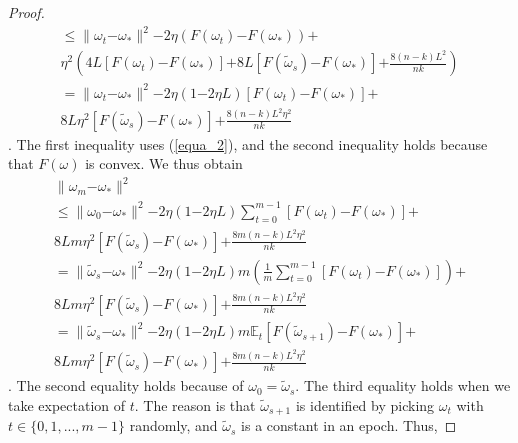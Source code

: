 \documentclass[letterpaper]{article}
\begin{document}
\begin{proof}
\begin{equation}
\begin{array}{ll}
\le \parallel  \omega_{t}\mathrm{-}\omega_\ast  \parallel^2  \mathrm{-}2\eta( F(\omega_t) \mathrm{-} F(\omega_\ast) ) \mathrm{+} \\
\eta^2 \left(  4L [F(\omega_t)\mathrm{-}F(\omega_\ast)] \mathrm{+} 8L [F(\tilde{\omega}_s)\mathrm{-}F(\omega_\ast)] \mathrm{+} \frac{8(n-k)L^2}{nk}\right)  \\ 
= \parallel  \omega_{t}\mathrm{-}\omega_\ast  \parallel^2  \mathrm{-}2\eta(1\mathrm{-}2\eta L) [F(\omega_t) \mathrm{-} F(\omega_\ast) ] \mathrm{+} \\
8L \eta^2 [F(\tilde{\omega}_s)\mathrm{-}F(\omega_\ast)] \mathrm{+} \frac{8(n-k)L^2\eta^2}{nk}
\end{array} 
\end{equation}. The first inequality uses (\ref{equa_2}), and the second inequality holds because that $F(\omega)$ is convex.  We thus obtain 
\begin{equation}
\begin{array}{ll}
\parallel  \omega_{m}\mathrm{-}\omega_\ast \parallel^2\\
\le \parallel  \omega_{0}\mathrm{-}\omega_\ast  \parallel^2  \mathrm{-}2\eta(1\mathrm{-}2\eta L)\sum\limits_{t=0}^{m-1} [F(\omega_t) \mathrm{-} F(\omega_\ast) ] \mathrm{+} \\
8Lm \eta^2 [F(\tilde{\omega}_s)\mathrm{-}F(\omega_\ast)] \mathrm{+} \frac{8m(n-k)L^2\eta^2}{nk} \\
=\parallel  \tilde{\omega}_{s}\mathrm{-}\omega_\ast  \parallel^2  \mathrm{-}2\eta(1\mathrm{-}2\eta L)m \left(\frac{1}{m}\sum\limits_{t=0}^{m-1} [F(\omega_t) \mathrm{-} F(\omega_\ast) ] \right)\mathrm{+} \\
8Lm \eta^2 [F(\tilde{\omega}_s)\mathrm{-}F(\omega_\ast)] \mathrm{+} \frac{8m(n-k)L^2\eta^2}{nk}\\
= \parallel  \tilde{\omega}_{s}\mathrm{-}\omega_\ast  \parallel^2  \mathrm{-}2\eta(1\mathrm{-}2\eta L)m \mathbb{E}_t[F(\tilde{\omega}_{s+1}) \mathrm{-} F(\omega_\ast) ] \mathrm{+} \\
8Lm \eta^2 [F(\tilde{\omega}_s)\mathrm{-}F(\omega_\ast)] \mathrm{+} \frac{8m(n-k)L^2\eta^2}{nk}
\end{array} 
\end{equation}. The second equality  holds because of $\omega_0=\tilde{\omega}_s$. The third equality holds when we take expectation of $t$. The reason is that $\tilde{\omega}_{s+1}$  is identified by picking $\omega_t$ with $t\in\{0,1, ..., m-1\}$ randomly, and $\tilde{\omega}_s$ is a constant in an epoch.  Thus, 

\end{proof}
\end{document}
